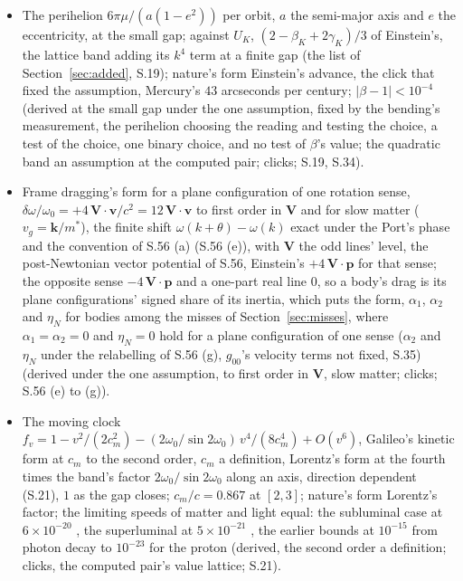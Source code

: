\documentclass[pdflatex,sn-mathphys-num]{sn-jnl}
\theoremstyle{thmstyleone}
\theoremstyle{thmstyletwo}
\begin{document}
\begin{itemize}[nosep,leftmargin=1.2em]
\item The perihelion $6\pi\mu / (a(1 - e^2))$ per orbit, $a$ the semi-major axis and $e$ the eccentricity, at the small gap; against $U_K$, $(2 - \beta_K + 2\gamma_K) / 3$ of Einstein's, the lattice band adding its $k^4$ term at a finite gap (the list of Section~\ref{sec:added}, S.19); nature's form Einstein's advance, the click that fixed the assumption, Mercury's $43$ arcseconds per century; $|\beta - 1| < 10^{-4}$ \cite{will} (derived at the small gap under the one assumption, fixed by the bending's measurement, the perihelion choosing the reading and testing the choice, a test of the choice, one binary choice, and no test of $\beta$'s value; the quadratic band an assumption at the computed pair; clicks; S.19, S.34).
\item Frame dragging's form for a plane configuration of one rotation sense, $\delta\omega / \omega_0 = +4\,\mathbf V\cdot\mathbf v / c^2 = 12\,\mathbf V\cdot\mathbf v$ to first order in $\mathbf V$ and for slow matter ($v_g = \mathbf k / m^*$), the finite shift $\omega(k + \theta) - \omega(k)$ exact under the Port's phase and the convention of S.56 (a) (S.56 (e)), with $\mathbf V$ the odd lines' level, the post-Newtonian vector potential of S.56, Einstein's $+4\,\mathbf V\cdot\mathbf p$ for that sense; the opposite sense $-4\,\mathbf V\cdot\mathbf p$ and a one-part real line $0$, so a body's drag is its plane configurations' signed share of its inertia, which puts the form, $\alpha_1$, $\alpha_2$ and $\eta_N$ for bodies among the misses of Section~\ref{sec:misses}, where $\alpha_1 = \alpha_2 = 0$ and $\eta_N = 0$ hold for a plane configuration of one sense ($\alpha_2$ and $\eta_N$ under the relabelling of S.56 (g), $g_{00}$'s velocity terms not fixed, S.35) (derived under the one assumption, to first order in $\mathbf V$, slow matter; clicks; S.56 (e) to (g)).
\item The moving clock $f_v = 1 - v^2 / (2c_m^2) - (2\omega_0 / \sin 2\omega_0)\,v^4 / (8c_m^4) + O(v^6)$, Galileo's kinetic form at $c_m$ to the second order, $c_m$ a definition, Lorentz's form at the fourth times the band's factor $2\omega_0 / \sin 2\omega_0$ along an axis, direction dependent (S.21), $1$ as the gap closes; $c_m / c = 0.867$ at $[2, 3]$; nature's form Lorentz's factor; the limiting speeds of matter and light equal: the subluminal case at $6 \times 10^{-20}$ \cite{altschul}, the superluminal at $5 \times 10^{-21}$ \cite{stecker}, the earlier bounds at $10^{-15}$ from photon decay to $10^{-23}$ for the proton \cite{coleman} (derived, the second order a definition; clicks, the computed pair's value lattice; S.21).

\end{itemize}
\end{document}
